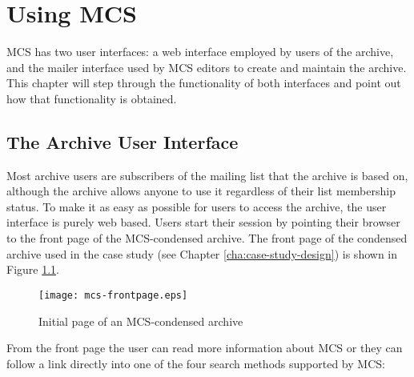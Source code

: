 \chapter{Using MCS}
\label{cha:using-mcs}
MCS has two user interfaces: a web interface employed by users of the archive,
and the mailer interface used by MCS editors to create and maintain the
archive. This chapter will step through the functionality of both interfaces
and point out how that functionality is obtained.

\section{The Archive User Interface}
\label{sec:archive-user-interface}
Most archive users are subscribers of the mailing list that the archive is
based on, although the archive allows anyone to use it regardless of their list
membership status. To make it as easy as possible for users to access the
archive, the user interface is purely web based. Users start their session by
pointing their browser to the front page of the MCS-condensed archive. The
front page of the condensed archive used in the case study (see Chapter
\ref{cha:case-study-design}) is shown in Figure \ref{fig:mcs-frontpage}.

\begin{figure}[htbp]
  \centering
  \texttt{[image: mcs-frontpage.eps]}
  \caption{Initial page of an MCS-condensed archive}
  \label{fig:mcs-frontpage}
\end{figure}

From the front page the user can read more information about MCS or they can
follow a link directly into one of the four search methods supported by MCS:

